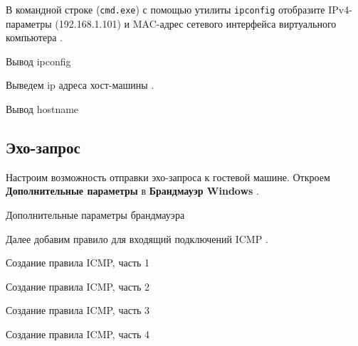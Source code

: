В командной строке (\texttt{cmd.exe}) с помощью утилиты \texttt{ipconfig}
отобразите IPv4-параметры (192.168.1.101) и MAC-адрес сетевого интерфейса
виртуального компьютера .

\begin{image}
	\caption{Вывод ipconfig}
	\label{fig:ipconfig}
\end{image}

Выведем ip адреса хост-машины .

\begin{image}
	\caption{Вывод hostname}
	\label{fig:host:ip}
\end{image}

\subsection{Эхо-запрос}

Настроим возможность отправки эхо-запроса к гостевой машине.
Откроем \textbf{Дополнительные параметры} в \textbf{Брандмауэр Windows}
.

\begin{image}
	\caption{Дополнительные параметры брандмауэра}
	\label{fig:firewall:setting}
\end{image}

Далее добавим правило для входящий подключений ICMP
.

\begin{image}
	\caption{Создание правила ICMP, часть 1}
	\label{fig:icmp:1}
\end{image}

\begin{image}
	\caption{Создание правила ICMP, часть 2}
	\label{fig:icmp:2}
\end{image}

\begin{image}
	\caption{Создание правила ICMP, часть 3}
	\label{fig:icmp:3}
\end{image}

\begin{image}
	\caption{Создание правила ICMP, часть 4}
	\label{fig:icmp:4}
\end{image}


